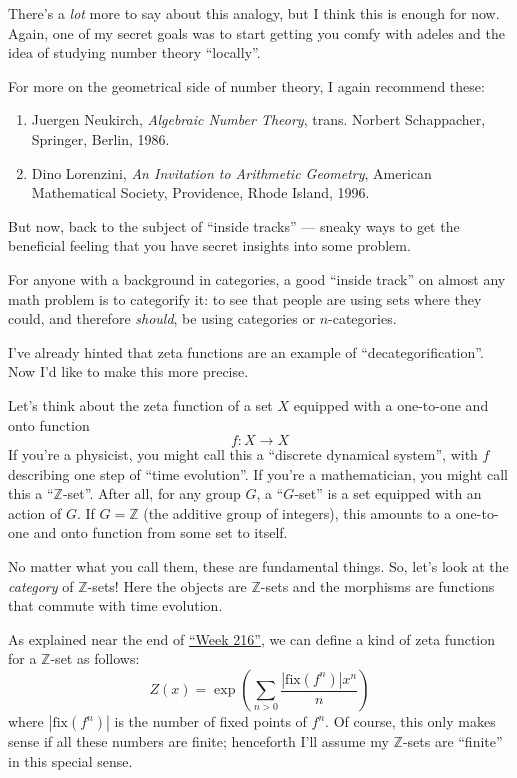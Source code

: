 \documentclass{article}
\begin{document}
There's a \emph{lot} more to say about this analogy, but I think this is
enough for now. Again, one of my secret goals was to start getting you
comfy with adeles and the idea of studying number theory ``locally''.

For more on the geometrical side of number theory, I again recommend
these:

\begin{enumerate}
\def\labelenumi{\arabic{enumi})}
\setcounter{enumi}{3}
\item
  Juergen Neukirch, \emph{Algebraic Number Theory}, trans. Norbert
  Schappacher, Springer, Berlin, 1986.
\item
  Dino Lorenzini, \emph{An Invitation to Arithmetic Geometry}, American
  Mathematical Society, Providence, Rhode Island, 1996.
\end{enumerate}

But now, back to the subject of ``inside tracks'' --- sneaky ways to get
the beneficial feeling that you have secret insights into some problem.

For anyone with a background in categories, a good ``inside track'' on
almost any math problem is to categorify it: to see that people are
using sets where they could, and therefore \emph{should}, be using
categories or \(n\)-categories.

I've already hinted that zeta functions are an example of
``decategorification''. Now I'd like to make this more precise.

Let's think about the zeta function of a set \(X\) equipped with a
one-to-one and onto function \[f\colon X \to X\] If you're a physicist,
you might call this a ``discrete dynamical system'', with \(f\)
describing one step of ``time evolution''. If you're a mathematician,
you might call this a ``\(\mathbb{Z}\)-set''. After all, for any group
\(G\), a ``\(G\)-set'' is a set equipped with an action of \(G\). If
\(G = \mathbb{Z}\) (the additive group of integers), this amounts to a
one-to-one and onto function from some set to itself.

No matter what you call them, these are fundamental things. So, let's
look at the \emph{category} of \(\mathbb{Z}\)-sets! Here the objects are
\(\mathbb{Z}\)-sets and the morphisms are functions that commute with
time evolution.

As explained near the end of \protect\hyperlink{week216}{``Week 216''},
we can define a kind of zeta function for a \(\mathbb{Z}\)-set as
follows:
\[Z(x) = \exp\left(\sum_{n>0} \frac{|\mathrm{fix}(f^n)| x^n}{n}\right)\]
where \(|\mathrm{fix}(f^n)|\) is the number of fixed points of \(f^n\).
Of course, this only makes sense if all these numbers are finite;
henceforth I'll assume my \(\mathbb{Z}\)-sets are ``finite'' in this
special sense.
\end{document}
